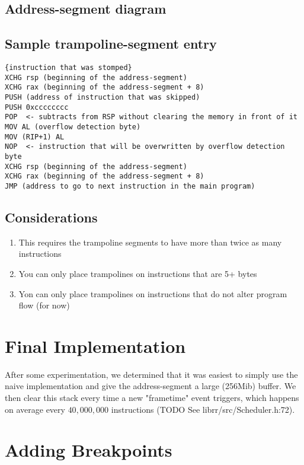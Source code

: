 \subsection{Address-segment diagram}
\begin{drawstack}
  \startframe
   
   \cellcom{}
     
  \startframe
   \cellcom{}
     
   
   \cellcom{}
   \cellcom{}
   \cellcom{}
   
\end{drawstack}


\subsection{Sample trampoline-segment entry}

\begin{verbatim}
{instruction that was stomped}
XCHG rsp (beginning of the address-segment)
XCHG rax (beginning of the address-segment + 8)
PUSH (address of instruction that was skipped)
PUSH 0xcccccccc
POP  <- subtracts from RSP without clearing the memory in front of it 
MOV AL (overflow detection byte) 
MOV (RIP+1) AL
NOP  <- instruction that will be overwritten by overflow detection byte
XCHG rsp (beginning of the address-segment)
XCHG rax (beginning of the address-segment + 8)
JMP (address to go to next instruction in the main program)
\end{verbatim}


\subsection{Considerations}
\begin{enumerate}
    \item This requires the trampoline segments to have more than twice as many instructions
    \item You can only place trampolines on instructions that are 5+ bytes 
    \item Yon can only place trampolines on instructions that do not alter program flow (for now)
\end{enumerate}
\section{Final Implementation}
After some experimentation, we determined that it was easiest to simply use the naive implementation and give the address-segment a large (256Mib) buffer. We then clear this stack every time a new "frametime" event triggers, which happens on average every $40,000,000$ instructions (TODO See librr/src/Scheduler.h:72).

\section{Adding Breakpoints}
